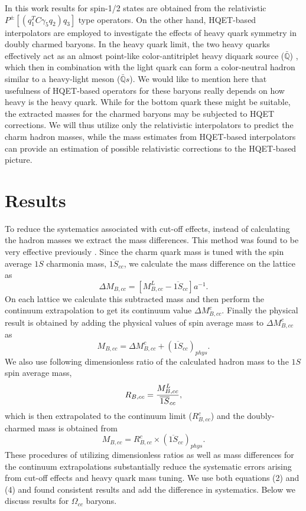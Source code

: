 \documentclass[showkeys,aps,twocolumn,showpacs,preprintnumbers,amsmath,amssymb,prl,letterpaper,floatfix,nofootinbib,superscriptaddress,]{revtex4-1}
\newcommand\beq{\begin{equation}}
\newcommand\eeq[1]{\label{#1}\end{equation}}
\begin{document}
{{In this work results for spin-1/2 states are obtained from the relativistic $P^{\pm}[(q_1^T C\gamma_5 q_2) q_3]$ type operators. On the other hand, HQET-based interpolators are employed to investigate the effects of heavy 
quark symmetry in doubly charmed baryons. In the heavy
quark limit, the two heavy quarks effectively act as an almost
point-like color-antitriplet heavy diquark source ($\bar{\mathbb{Q}}$)
\cite{Manohar:1992nd}, which then in combination with the light quark
can form a color-neutral hadron similar to a heavy-light meson
($\bar{\mathbb{Q}}s$).  We would like to
mention here that usefulness of HQET-based operators for these baryons really
depends on how heavy is the heavy quark. While for the bottom quark these
might be suitable, the extracted masses for the charmed baryons may be
subjected to HQET corrections.
We will thus utilize only the relativistic interpolators to predict the charm hadron masses,  while the mass estimates from HQET-based
interpolators can provide an estimation of possible relativistic corrections to the HQET-based picture.


\section{Results}
To reduce the systematics associated with
cut-off effects, instead of calculating the hadron masses we extract the
mass differences. This method was found to be very effective previously \cite{Shanahan:1999mv,Mathur:2002ce,Dowdall:2012ab,Brown:2014ena}.
Since the charm quark 
mass is tuned with the spin average $1S$ charmonia mass, $\overline{1S}_{cc}$,
we calculate the mass difference on the lattice as 
\beq
\Delta M_{B,cc} = [M^{L}_{B,cc} - \overline{1S}_{cc}]a^{-1}.
\eeq{submass}
On each lattice we calculate this subtracted mass and then perform the 
continuum extrapolation to get its continuum value $\Delta M^{c}_{B,cc}$. Finally the physical result is obtained by
adding the physical values of spin average mass to $\Delta M^{c}_{B,cc}$ as 
\begin{equation}
M_{B,cc} = \Delta M^{c}_{B,cc} + (\overline{1S}_{cc})_{phys}.
\end{equation}
We also use following dimensionless ratio of the calculated hadron mass to the $1S$ spin average mass,
\begin{equation}
	R_{B,cc} =  {{M^{L}_{B,cc}}\over{\overline{1S}_{cc}}},
\end{equation}
which is then extrapolated to the continuum limit ($R^{c}_{B,cc}$) and the doubly-charmed mass is obtained from
\begin{equation}
M_{B,cc} = R^{c}_{B,cc} \times (\overline{1S}_{cc})_{phys}.
\end{equation}
These procedures of utilizing dimensionless ratios as well as mass differences for the continuum extrapolations  substantially 
reduce the systematic errors arising from cut-off effects and heavy quark mass tuning.  We use both equations (2) and (4) and found consistent results and add the difference in systematics. Below we discuss results for $\Omega_{cc}$  baryons.


}}
\end{document}
